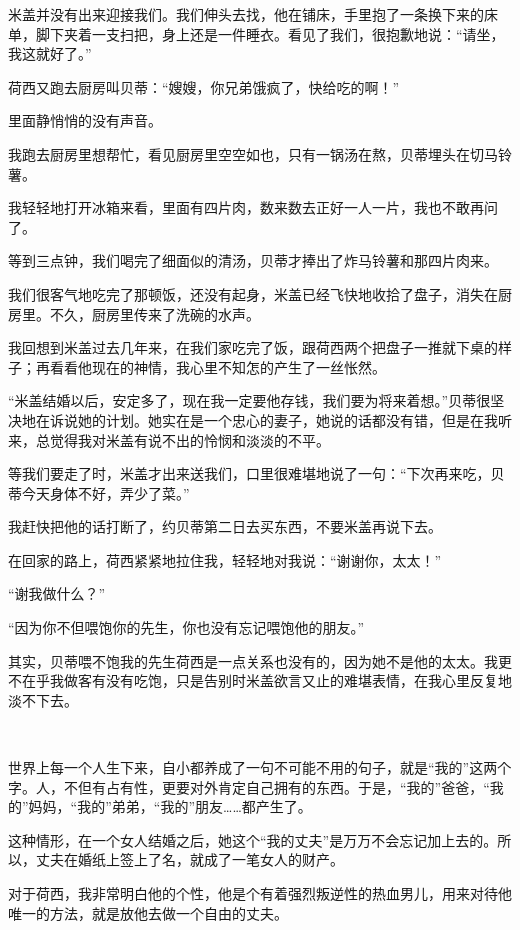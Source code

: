 \par 米盖并没有出来迎接我们。我们伸头去找，他在铺床，手里抱了一条换下来的床单，脚下夹着一支扫把，身上还是一件睡衣。看见了我们，很抱歉地说：“请坐，我这就好了。”
\par 荷西又跑去厨房叫贝蒂：“嫂嫂，你兄弟饿疯了，快给吃的啊！”
\par 里面静悄悄的没有声音。
\par 我跑去厨房里想帮忙，看见厨房里空空如也，只有一锅汤在熬，贝蒂埋头在切马铃薯。
\par 我轻轻地打开冰箱来看，里面有四片肉，数来数去正好一人一片，我也不敢再问了。
\par 等到三点钟，我们喝完了细面似的清汤，贝蒂才捧出了炸马铃薯和那四片肉来。
\par 我们很客气地吃完了那顿饭，还没有起身，米盖已经飞快地收拾了盘子，消失在厨房里。不久，厨房里传来了洗碗的水声。
\par 我回想到米盖过去几年来，在我们家吃完了饭，跟荷西两个把盘子一推就下桌的样子；再看看他现在的神情，我心里不知怎的产生了一丝怅然。
\par “米盖结婚以后，安定多了，现在我一定要他存钱，我们要为将来着想。”贝蒂很坚决地在诉说她的计划。她实在是一个忠心的妻子，她说的话都没有错，但是在我听来，总觉得我对米盖有说不出的怜悯和淡淡的不平。
\par 等我们要走了时，米盖才出来送我们，口里很难堪地说了一句：“下次再来吃，贝蒂今天身体不好，弄少了菜。”
\par 我赶快把他的话打断了，约贝蒂第二日去买东西，不要米盖再说下去。
\par 在回家的路上，荷西紧紧地拉住我，轻轻地对我说：“谢谢你，太太！”
\par “谢我做什么？”
\par “因为你不但喂饱你的先生，你也没有忘记喂饱他的朋友。”
\par 其实，贝蒂喂不饱我的先生荷西是一点关系也没有的，因为她不是他的太太。我更不在乎我做客有没有吃饱，只是告别时米盖欲言又止的难堪表情，在我心里反复地淡不下去。
\par  
\par 世界上每一个人生下来，自小都养成了一句不可能不用的句子，就是“我的”这两个字。人，不但有占有性，更要对外肯定自己拥有的东西。于是，“我的”爸爸，“我的”妈妈，“我的”弟弟，“我的”朋友……都产生了。
\par 这种情形，在一个女人结婚之后，她这个“我的丈夫”是万万不会忘记加上去的。所以，丈夫在婚纸上签上了名，就成了一笔女人的财产。
\par 对于荷西，我非常明白他的个性，他是个有着强烈叛逆性的热血男儿，用来对待他唯一的方法，就是放他去做一个自由的丈夫。
